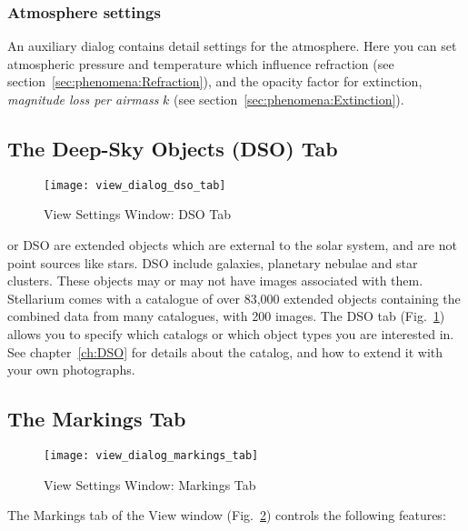 \subsubsection{Atmosphere settings}
\label{sec:gui:view:sky:atmosphere}

An auxiliary dialog contains detail settings for the atmosphere. Here
you can set atmospheric pressure and temperature which influence
refraction (see section~\ref{sec:phenomena:Refraction}), and the
opacity factor for extinction, \emph{magnitude loss per airmass} $k$
(see section~\ref{sec:phenomena:Extinction}).


\subsection{The Deep-Sky Objects (DSO) Tab}
\label{sec:gui:view:dso}

\begin{figure}[t]
\texttt{[image: view\_dialog\_dso\_tab]}
\caption{View Settings Window: DSO Tab}
\label{fig:gui:view:dso}
\end{figure}


 or DSO are extended objects which are
external to the solar system, and are not point sources like stars.
DSO include galaxies, planetary nebulae and star clusters. These
objects may or may not have images associated with them. Stellarium
comes with a catalogue of over 83,000 extended objects containing
the combined data from many catalogues, with 200 images.  The DSO tab
(Fig.~\ref{fig:gui:view:dso}) allows you to specify which catalogs or
which object types you are interested in. See chapter~\ref{ch:DSO} for
details about the catalog, and how to extend it with your own photographs.





\subsection{The Markings Tab}
\label{sec:gui:view:markings}

\begin{figure}[t]
\centering\texttt{[image: view\_dialog\_markings\_tab]}
\caption{View Settings Window: Markings Tab}
\label{fig:gui:view:markings}
\end{figure}

The Markings tab of the View window
(Fig.~\ref{fig:gui:view:markings}) controls the following features:

